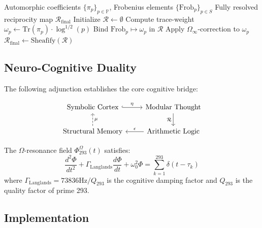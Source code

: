 \documentclass[12pt]{article}
\begin{document}
\begin{algorithm}[H]
\caption{$\Omega$-Stabilized Reciprocity Mapping}
\begin{algorithmic}[1]
\Require Automorphic coefficients $\{\pi_p\}_{p\in\mathbb{P}}$, Frobenius elements $\{\text{Frob}_p\}_{p\in S}$
\Ensure Fully resolved reciprocity map $\mathcal{R}_{\text{final}}$
\State Initialize $\mathcal{R} \leftarrow \emptyset$
    \State Compute trace-weight $\omega_p \gets \text{Tr}(\pi_p) \cdot \log^{1/2}(p)$
    \State Bind $\text{Frob}_p \mapsto \omega_p$ in $\mathcal{R}$
    \State Apply $\Omega_\infty$-correction to $\omega_p$
\EndFor
\State \Return $\mathcal{R}_{\text{final}} \gets \text{Sheafify}(\mathcal{R})$
\end{algorithmic}
\end{algorithm}

\subsection{Neuro-Cognitive Duality}

The following adjunction establishes the core cognitive bridge:

\[
\begin{tikzcd}
\text{Symbolic Cortex} \ar[r, "\eta", hook] & \text{Modular Thought} \ar[d, "\mathcal{R}"'] \\
\text{Structural Memory} \ar[u, "\mu"', dashrightarrow] & \text{Arithmetic Logic} \ar[l, "\epsilon"']
\end{tikzcd}
\]

\begin{proposition}
The $\Omega$-resonance field $\Phi_{293}^{\Omega}(t)$ satisfies:
\[
\frac{d^2\Phi}{dt^2} + \Gamma_{\text{Langlands}} \frac{d\Phi}{dt} + \omega_0^2 \Phi = \sum_{k=1}^{293} \delta(t - \tau_k)
\]
where $\Gamma_{\text{Langlands}} = 73836 \text{Hz}/Q_{293}$ is the cognitive damping factor and $Q_{293}$ is the quality factor of prime 293.
\end{proposition}

\subsection{Implementation}
\end{document}
